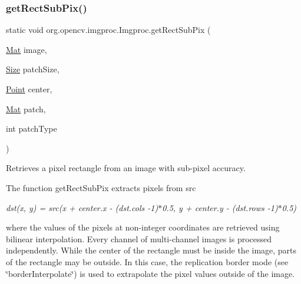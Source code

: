 \subsubsection{\texorpdfstring{get\+Rect\+Sub\+Pix()}{getRectSubPix()}\hspace{0.1cm}{\footnotesize\ttfamily [1/2]}}
{\footnotesize\ttfamily static void org.\+opencv.\+imgproc.\+Imgproc.\+get\+Rect\+Sub\+Pix (\begin{DoxyParamCaption}\item[{\mbox{\hyperlink{classorg_1_1opencv_1_1core_1_1_mat}{Mat}}}]{image,  }\item[{\mbox{\hyperlink{classorg_1_1opencv_1_1core_1_1_size}{Size}}}]{patch\+Size,  }\item[{\mbox{\hyperlink{classorg_1_1opencv_1_1core_1_1_point}{Point}}}]{center,  }\item[{\mbox{\hyperlink{classorg_1_1opencv_1_1core_1_1_mat}{Mat}}}]{patch,  }\item[{int}]{patch\+Type }\end{DoxyParamCaption})\hspace{0.3cm}{\ttfamily [static]}}

Retrieves a pixel rectangle from an image with sub-\/pixel accuracy.

The function {\ttfamily get\+Rect\+Sub\+Pix} extracts pixels from {\ttfamily src}

{\itshape dst(x, y) = src(x + center.\+x -\/ (dst.\+cols -\/1)$\ast$0.5, y + center.\+y -\/ (dst.\+rows -\/1)$\ast$0.5)}

where the values of the pixels at non-\/integer coordinates are retrieved using bilinear interpolation. Every channel of multi-\/channel images is processed independently. While the center of the rectangle must be inside the image, parts of the rectangle may be outside. In this case, the replication border mode (see \char`\"{}border\+Interpolate\char`\"{}) is used to extrapolate the pixel values outside of the image.


